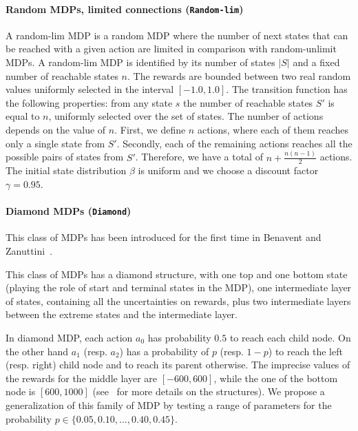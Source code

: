 \paragraph{Random MDPs, limited connections (\texttt{Random-lim})}
A random-lim MDP is a random MDP where the number of next states that can be reached with a given action are limited in comparison with random-unlimit MDPs. A random-lim MDP is identified by its number of states $|S|$ and a fixed number of reachable states $n$. The rewards are bounded between two real random values uniformly selected in the interval $[-1.0,1.0]$.
The transition function has the following properties: from any state $s$ the number of reachable states $S'$ is equal to $n$, uniformly selected over the set of states. The number of actions depends on the value of $n$. First, we define $n$ actions, where each of them reaches only a single state from $S'$. Secondly, each of the remaining actions reaches all the possible pairs of states from $S'$. Therefore, we have a total of $n+\frac{n(n-1)}{2}$ actions. The initial state distribution $\beta$ is uniform and we choose a discount factor $\gamma = 0.95$.
\paragraph{Diamond MDPs (\texttt{Diamond})}
This class of MDPs has been introduced for the first time in Benavent and Zanuttini~\cite{benavent2018}. 

This class of MDPs has a diamond structure, with one top and one bottom state (playing the role of start and terminal states in the MDP), one intermediate layer of states, containing all the uncertainties on rewards, plus two intermediate layers between the extreme states and the intermediate layer. 

In diamond MDP, each action $a_0$ has probability $0.5$ to reach each child node.  
On the other hand $a_1$ (resp. $a_2$) has a probability of $p$ (resp. $1-p$) to reach the left (resp. right) child node and to reach its parent otherwise. The imprecise values of the rewards for the middle layer are $[-600,600]$, while the one of the bottom node is $[600,1000]$ (see~\cite{benavent2018} for more details on the structures).
We propose a generalization of this family of MDP by testing a range of parameters for the probability $p \in \{0.05,0.10,\dots,0.40,0.45\}$. 



